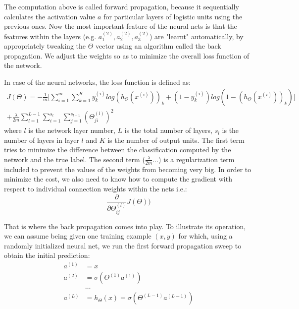 \documentclass[a4paper, 12pt]{article}
\numberwithin{equation}{section}
\begin{document}
	The computation above is called forward propagation, because it sequentially calculates the activation value $a$ for particular layers of logistic units using the previous ones. Now the most important feature of the neural nets is that the features within the layers (e.g. $a_1^{(2)}, a_2^{(2)}, a_3^{(2)}$) are "learnt" automatically, by appropriately tweaking the $\Theta$ vector using an algorithm called the back propagation. We adjust the weights so as to minimize the overall loss function of the network.
	
	In case of the neural networks, the loss function is defined as:
	\begin{align*}
	J(\Theta) = - \frac{1}{m} \Bigg[\sum_{i=1}^{m} \sum_{k=1}^{K} y_k^{(i)}log(h_\Theta(x^{(i)}))_k + (1-y_k^{(i)}) log(1-(h_\Theta(x^{(i)}))_k) \Bigg] \\+ \frac{\lambda}{2m} \sum_{l=1}^{L-1} \sum_{i=1}^{s_l} \sum_{j=1}^{s_{l+1}} (\Theta _ {ji} ^{(l)})^2
	\end{align*}
	where $l$ is the network layer number, $L$ is the total number of layers, $s_l$ is the number of layers in layer $l$ and $K$ is the number of output units. The first term tries to minimize the difference between the classification computed by the network and the true label. The second term ($\frac{\lambda}{2m} \ldots$) is a regularization term included to prevent the values of the weights from becoming very big.
	In order to minimize the cost, we also need to know how to compute the gradient with respect to individual connection weights within the nets i.e.:
	\begin{equation}
	\frac{\partial}{\partial \Theta_{ij}^{(l)}} J(\Theta))
	\end{equation}
	
	That is where the back propagation comes into play. To illustrate its operation, we can assume being given one training example $(x, y)$ for which, using a randomly initialized neural net, we run the first forward propagation sweep to obtain the initial prediction:
	\begin{align}
	a^{(1)} &= x \\
	a^{(2)} &= \sigma(\Theta^{(1)} a^{(1)}) \\
	&\ldots \\
	a^{(L)} &= h_{\Theta}(x)= \sigma(\Theta^{(L-1)} a^{(L-1)})
	\end{align}
	
\end{document}

